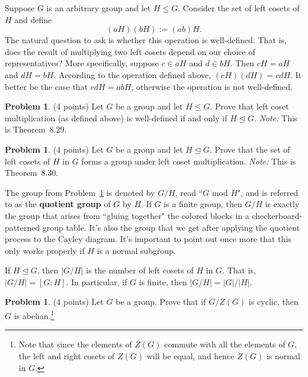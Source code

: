 \documentclass[11pt]{article}
\theoremstyle{definition}
\newtheorem{problem}[theorem]{Problem}
\newcommand{\blankline}{\pagebreak[2]\vspace{.5\baselineskip}}
\begin{document}
\blankline

Suppose $G$ is an arbitrary group and let $H\leq G$. Consider the set of left cosets of $H$ and define
\[
(aH)(bH):=(ab)H.
\]
The natural question to ask is whether this operation is well-defined.  That is, does the result of multiplying two left cosets depend on our choice of representatives?  More specifically, suppose $c\in aH$ and $d\in bH$.  Then $cH=aH$ and $dH=bH$.  According to the operation defined above, $(cH)(dH)=cdH$.  It better be the case that $cdH=abH$, otherwise the operation is not well-defined.

\begin{problem}
(4 points) Let $G$ be a group and let $H\leq G$.  Prove that left coset multiplication (as defined above) is well-defined if and only if $H\trianglelefteq G$. \emph{Note:} This is Theorem~8.29.
\end{problem}

\begin{problem}\label{prob:QuotientGrp}
(4 points) Let $G$ be a group and let $H\trianglelefteq G$.  Prove that the set of left cosets of $H$ in $G$ forms a group under left coset multiplication.  \emph{Note:} This is Theorem~8.30.
\end{problem}

The group from Problem~\ref{prob:QuotientGrp} is denoted by $G/H$, read ``$G$ mod $H$", and is referred to as the \textbf{quotient group} of $G$ by $H$.  If $G$ is a finite group, then $G/H$ is exactly the group that arises from ``gluing together" the colored blocks in a checkerboard-patterned group table.  It's also the group that we get after applying the quotient process to the Cayley diagram.  It's important to point out once more that this only works properly if $H$ is a normal subgroup.

\blankline

If $H\trianglelefteq G$, then $|G/H|$ is the number of left cosets of $H$ in $G$.  That is, $|G/H|=[G:H]$.  In particular, if $G$ is finite, then $|G/H|=|G|/|H|$.

\begin{problem}
(4 points) Let $G$ be a group.  Prove that if $G/Z(G)$ is cyclic, then $G$ is abelian.\footnote{Note that since the elements of $Z(G)$ commute with all the elements of $G$, the left and right cosets of $Z(G)$ will be equal, and hence $Z(G)$ is normal in $G$.}
\end{problem}
\end{document}
